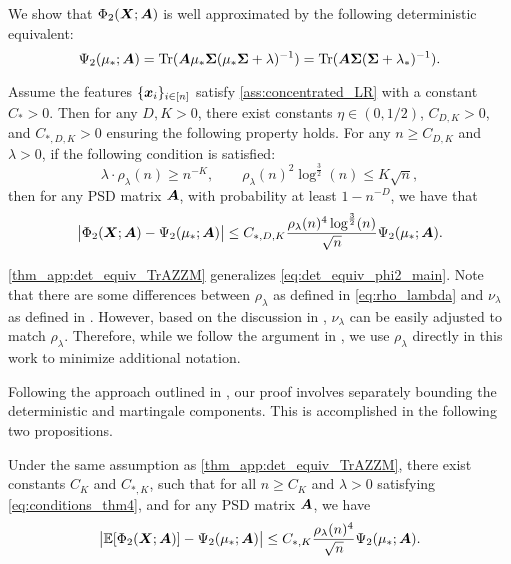 We show that $\Phi_2 ({\boldsymbol X};{\boldsymbol A})$ is well approximated by the following deterministic equivalent:
\[
\Psi_2(\mu_*; {\boldsymbol A}) = {\rm Tr}({\boldsymbol A} \mu_* {\boldsymbol \Sigma} ( \mu_* {\boldsymbol \Sigma} + \lambda)^{-1} ) = {\rm Tr}({\boldsymbol A} {\boldsymbol \Sigma} ( {\boldsymbol \Sigma} + \lambda_* )^{-1} ).
\]

\begin{theorem}\label{thm_app:det_equiv_TrAZZM}
    Assume the features $\{{\boldsymbol x}_i\}_{i\in[n]}$ satisfy \cref{ass:concentrated_LR} with a constant $C_* > 0$. Then for any $D,K>0$, there exist constants $\eta \in (0,1/2)$, $C_{D,K} >0$, and $C_{*,D,K}>0$ ensuring the following property holds. For any $n \geq C_{D,K}$ and  $\lambda >0$, if the following condition is satisfied:
    \begin{equation}\label{eq:conditions_thm4}
\lambda \cdot \rho_\lambda (n) \geq n^{-K}, \qquad  \rho_\lambda (n)^{2} \log^{\frac{3}{2}} (n) \leq K \sqrt{n} ,
    \end{equation}
    then for any PSD matrix ${\boldsymbol A}$, with probability at least $1 - n^{-D}$, we have that
    \begin{equation}
         \big\vert \Phi_2({\boldsymbol X};{\boldsymbol A}) - \Psi_2 (\mu_* ; {\boldsymbol A}) \big\vert \leq C_{*,D,K} \frac{ \rho_\lambda (n)^{4} \log^{\frac32} (n ) }{\sqrt{n}}   \Psi_2 (\mu_* ; {\boldsymbol A}) .
    \end{equation}
\end{theorem}
 \cref{thm_app:det_equiv_TrAZZM} generalizes \cref{eq:det_equiv_phi2_main}. Note that there are some differences between \(\rho_\lambda\) as defined in \cref{eq:rho_lambda} and \(\nu_\lambda\) as defined in \cite{misiakiewicz2024non}. However, based on the discussion in \citet[Appendix A]{defilippis2024dimension}, \(\nu_\lambda\) can be easily adjusted to match \(\rho_\lambda\). Therefore, while we follow the argument in \cite{misiakiewicz2024non}, we use \(\rho_\lambda\) directly in this work to minimize additional notation.


Following the approach outlined in \cite{misiakiewicz2024non}, our proof involves separately bounding the deterministic and martingale components. This is accomplished in the following two propositions.

\begin{proposition}\label{prop:TrAZZM_LOO}
    Under the same assumption as \cref{thm_app:det_equiv_TrAZZM}, there exist constants $C_K$ and $C_{*,K}$, such that for all $n \geq C_K$ and $\lambda >0$ satisfying \cref{eq:conditions_thm4}, and for any PSD matrix ${\boldsymbol A}$, we have
    \begin{equation}\label{eq:det_part_TrAZZM}
         \big\vert\mathbb{E} [ \Phi_2({\boldsymbol X};{\boldsymbol A}) ] - \Psi_2 (\mu_* ; {\boldsymbol A}) \big\vert \leq C_{*,K} \frac{ \rho_\lambda (n)^{4} }{\sqrt{n}}   \Psi_2 (\mu_* ; {\boldsymbol A}) .
    \end{equation}
\end{proposition}

